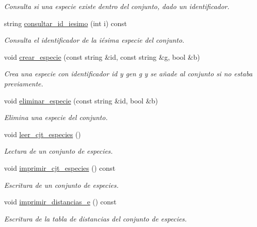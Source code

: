 \begin{DoxyCompactItemize}
\begin{DoxyCompactList}\small\item\em Consulta si una especie existe dentro del conjunto, dado un identificador. \end{DoxyCompactList}\item 
string \hyperlink{class_cjt___especies_a0cc233873c53e5120cd362de7821eb16}{consultar\+\_\+id\+\_\+iesimo} (int i) const
\begin{DoxyCompactList}\small\item\em Consulta el identificador de la iésima especie del conjunto. \end{DoxyCompactList}\item 
void \hyperlink{class_cjt___especies_a9f4f280a276c325a609d469bfae7de93}{crear\+\_\+especie} (const string \&id, const string \&g, bool \&b)
\begin{DoxyCompactList}\small\item\em Crea una especie con identificador id y gen g y se añade al conjunto si no estaba previamente. \end{DoxyCompactList}\item 
void \hyperlink{class_cjt___especies_a9c480bd8e1d39656ab14abfd3a2325fb}{eliminar\+\_\+especie} (const string \&id, bool \&b)
\begin{DoxyCompactList}\small\item\em Elimina una especie del conjunto. \end{DoxyCompactList}\item 
void \hyperlink{class_cjt___especies_ace9e160297bf1ab372795594fed08fcc}{leer\+\_\+cjt\+\_\+especies} ()
\begin{DoxyCompactList}\small\item\em Lectura de un conjunto de especies. \end{DoxyCompactList}\item 
void \hyperlink{class_cjt___especies_ac5f9fbeb99f136c535522466780d4f96}{imprimir\+\_\+cjt\+\_\+especies} () const
\begin{DoxyCompactList}\small\item\em Escritura de un conjunto de especies. \end{DoxyCompactList}\item 
void \hyperlink{class_cjt___especies_a206f42af24c4d59c414aec147e80e7c3}{imprimir\+\_\+distancias\+\_\+e} () const
\begin{DoxyCompactList}\small\item\em Escritura de la tabla de distancias del conjunto de especies. \end{DoxyCompactList}\end{DoxyCompactItemize}
